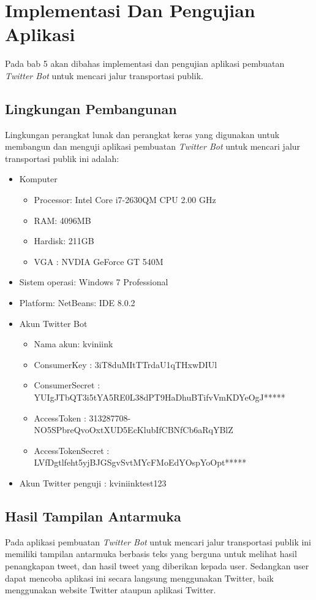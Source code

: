 \chapter{Implementasi Dan Pengujian Aplikasi}
\label{chap:implementasi dan pengujian aplikasi}

Pada bab 5 akan dibahas implementasi dan pengujian aplikasi pembuatan \textit{Twitter Bot} untuk mencari jalur transportasi publik.

\section{Lingkungan Pembangunan}
Lingkungan perangkat lunak dan perangkat keras yang digunakan untuk membangun dan menguji aplikasi pembuatan \textit{Twitter Bot} untuk mencari jalur transportasi publik ini adalah:
\begin{itemize}
	\item Komputer
	
	
	\begin{itemize}
		\item Processor: Intel Core i7-2630QM CPU 2.00 GHz
		\item RAM: 4096MB
		\item Hardisk: 211GB
		\item VGA : NVDIA GeForce GT 540M
	\end{itemize}
	\item Sistem operasi: Windows 7 Professional
	\item Platform: NetBeans: IDE 8.0.2
	
	\item Akun Twitter Bot
	\begin{itemize}
		\item Nama akun: kviniink
		\item ConsumerKey : 3iT8duMItTTrdaU1qTHxwDIUl
		\item ConsumerSecret : YUIgJTbQT3i5tYA5RE0L38dPT9HaDhuBTifvVmKDYeOgJ*****
		\item AccessToken : 313287708-NO5SPbreQvoOxtXUD5EcKlubIfCBNfCb6aRqYBlZ
		\item AccessTokenSecret : LVfDgtlfeht5yjBJGSgvSvtMYcFMoEdYOspYoOpt*****
	\end{itemize}
	
	\item Akun Twitter penguji : kviniinktest123
\end{itemize}

\iffalse
\section{Hasil Tampilan Antarmuka}
Pada aplikasi pembuatan \textit{Twitter Bot} untuk mencari jalur transportasi publik ini memiliki tampilan antarmuka berbasis teks yang berguna untuk melihat hasil penangkapan tweet, dan hasil tweet yang diberikan kepada user. Sedangkan user dapat mencoba aplikasi ini secara langsung menggunakan Twitter, baik menggunakan website Twitter ataupun aplikasi Twitter. 

